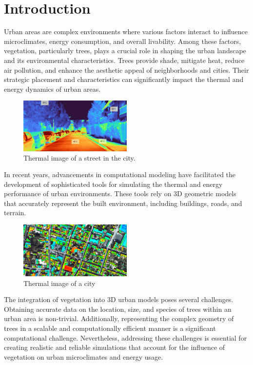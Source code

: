 \documentclass[12pt]{article}
\begin{document}
\newpage

\section{Introduction}
Urban areas are complex environments where various factors interact to influence 
microclimates, energy consumption, and overall livability. Among these factors, 
vegetation, particularly trees, plays a crucial role in shaping the urban landscape 
and its environmental characteristics. Trees provide shade, mitigate heat, reduce 
air pollution, and enhance the aesthetic appeal of neighborhoods and cities. Their 
strategic placement and characteristics can significantly impact the thermal and 
energy dynamics of urban areas.

\begin{figure}[H]
    \centering
    \includegraphics[width=0.5\textwidth]{images/heat_street.png}
    \caption{Thermal image of a street in the city. \cite{img:street_thermography}}
\end{figure}

In recent years, advancements in computational modeling have facilitated the 
development of sophisticated tools for simulating the thermal and energy performance 
of urban environments. These tools rely on 3D geometric models that accurately 
represent the built environment, including buildings, roads, and terrain.

\begin{figure}[H]
    \centering
    \includegraphics[width=0.5\textwidth]{images/thermographie-aerienne.jpg}
    \caption{Thermal image of a city \cite{img:aerialview}}
\end{figure}

The integration of vegetation into 3D urban models poses several challenges. 
Obtaining accurate data on the location, size, and species of trees within an 
urban area is non-trivial. Additionally, representing the complex geometry of trees 
in a scalable and computationally efficient manner is a significant computational 
challenge. Nevertheless, addressing these challenges is essential for creating 
realistic and reliable simulations that account for the influence of vegetation on 
urban microclimates and energy usage.
\end{document}
